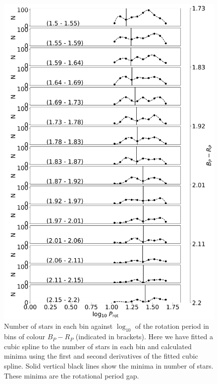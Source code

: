 \begin{figure}
\centering
  \includegraphics[width=\textwidth]{Figures/rot_gap_figures/n_col.png}
  \caption[Number of stars in each bin against $\log_{10}$ of the rotation period in bins of colour \gaia{} $B_P-R_P$.]{
  	Number of stars in each bin against $\log_{10}$ of the rotation period in bins of colour \gaia{} $B_P-R_P$ (indicated in brackets). Here we have fitted a cubic spline to the number of stars in each bin and calculated minima using the first and second derivatives of the fitted cubic spline. Solid vertical black lines show the minima in number of stars. These minima are the rotational period gap.
}
  \label{fig:n_col}
\end{figure}

